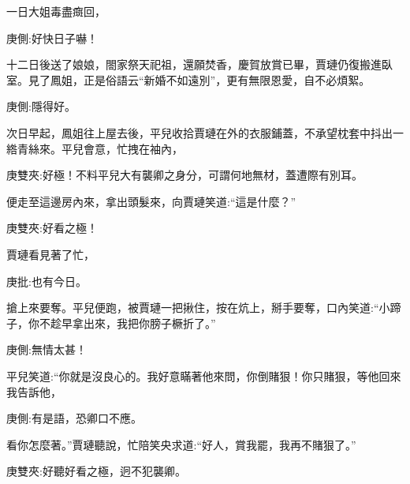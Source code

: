 \begin{parag}
\end{parag}


\begin{parag}
    一日大姐毒盡癍回，\begin{note}庚側:好快日子嚇！\end{note}十二日後送了娘娘，閤家祭天祀祖，還願焚香，慶賀放賞已畢，賈璉仍復搬進臥室。見了鳳姐，正是俗語云“新婚不如遠別”，更有無限恩愛，自不必煩絮。\begin{note}庚側:隱得好。\end{note}
\end{parag}


\begin{parag}
    次日早起，鳳姐往上屋去後，平兒收拾賈璉在外的衣服鋪蓋，不承望枕套中抖出一綹青絲來。平兒會意，忙拽在袖內，\begin{note}庚雙夾:好極！不料平兒大有襲卿之身分，可謂何地無材，蓋遭際有別耳。\end{note}便走至這邊房內來，拿出頭髮來，向賈璉笑道:“這是什麼？”\begin{note}庚雙夾:好看之極！\end{note}賈璉看見著了忙，\begin{note}庚批:也有今日。\end{note}搶上來要奪。平兒便跑，被賈璉一把揪住，按在炕上，掰手要奪，口內笑道:“小蹄子，你不趁早拿出來，我把你膀子橛折了。”\begin{note}庚側:無情太甚！\end{note}平兒笑道:“你就是沒良心的。我好意瞞著他來問，你倒賭狠！你只賭狠，等他回來我告訴他，\begin{note}庚側:有是語，恐卿口不應。\end{note}看你怎麼著。”賈璉聽說，忙陪笑央求道:“好人，賞我罷，我再不賭狠了。”\begin{note}庚雙夾:好聽好看之極，迥不犯襲卿。\end{note}
\end{parag}


